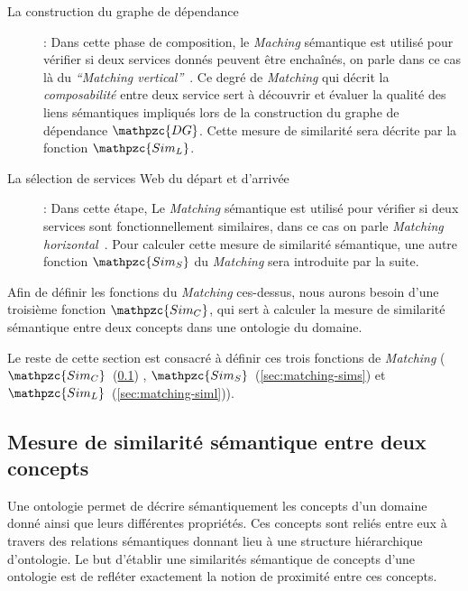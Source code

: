 \begin{description}
\item [La construction du graphe de dépendance]: Dans cette phase de
  composition, le \emph{Maching} sémantique est utilisé pour vérifier
  si deux services donnés peuvent être enchaînés, on parle dans ce cas
  là du \emph{``Matching vertical''}~\cite{temglit2012graph}. Ce degré
  de \emph{Matching} qui décrit la \emph{composabilité} entre deux
  service sert à découvrir et évaluer la qualité des liens sémantiques
  impliqués lors de la construction du graphe de dépendance
  $\mathpzc{DG}$. Cette mesure de similarité sera décrite par la
  fonction {\large $\mathpzc{Sim_L}$}.\

\item [La sélection de services Web du départ et d'arrivée]: Dans
  cette étape, Le \emph{Matching} sémantique est utilisé pour vérifier
  si deux services sont fonctionnellement similaires, dans ce cas on
  parle \emph{Matching horizontal}~\cite{temglit2012graph}. Pour
  calculer cette mesure de similarité sémantique, une autre fonction
  {\large $\mathpzc{Sim_S}$} du \emph{Matching} sera introduite par la
  suite.\medskip
\end{description}

Afin de définir les fonctions du \emph{Matching} ces-dessus, nous
aurons besoin d'une troisième fonction {\large $\mathpzc{Sim_C}$}, qui
sert à calculer la mesure de similarité sémantique entre deux concepts
dans une ontologie du domaine.\medskip

Le reste de cette section est consacré à définir ces trois fonctions
de \emph{Matching} ({\large
  $\mathpzc{Sim_C}$}~(\ref{sec:matching-simc}) , {\large
  $\mathpzc{Sim_S}$}~(\ref{sec:matching-sims}) et {\large
  $\mathpzc{Sim_L}$}~(\ref{sec:matching-siml})).

\newpage
\subsection{Mesure de similarité sémantique entre deux concepts}
\label{sec:matching-simc}

Une ontologie permet de décrire sémantiquement les concepts d'un
domaine donné ainsi que leurs différentes propriétés. Ces concepts
sont reliés entre eux à travers des relations sémantiques donnant lieu
à une structure hiérarchique d'ontologie. Le but d'établir une
similarités sémantique de concepts d'une ontologie est de refléter
exactement la notion de proximité entre ces concepts.\medskip

